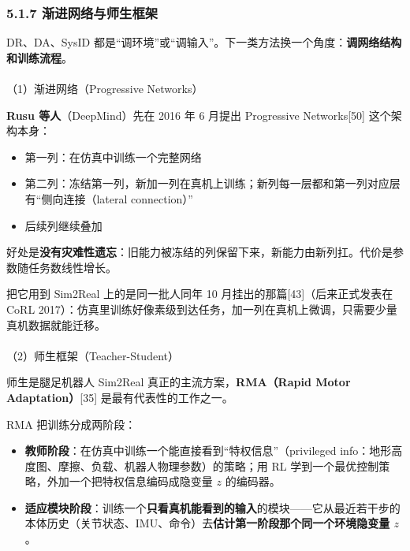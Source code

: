 \documentclass[
  chinese,
]{ctexart}
\makeatletter
\let\oldparagraph\paragraph
\renewcommand{\paragraph}{
    \@ifstar
      \xxxParagraphStar
      \xxxParagraphNoStar
  }
\newcommand{\xxxParagraphStar}[1]{\oldparagraph*{#1}\mbox{}}
\newcommand{\xxxParagraphNoStar}[1]{\oldparagraph{#1}\mbox{}}
\providecommand{\tightlist}{%
  \setlength{\itemsep}{0pt}\setlength{\parskip}{0pt}}
\makeatother
\begin{document}
\subsubsection{5.1.7
渐进网络与师生框架}\label{ux6e10ux8fdbux7f51ux7edcux4e0eux5e08ux751fux6846ux67b6}

DR、DA、SysID
都是``调环境''或``调输入''。下一类方法换一个角度：\textbf{调网络结构和训练流程}。

\paragraph{（1）渐进网络（Progressive
Networks）}\label{ux6e10ux8fdbux7f51ux7edcprogressive-networks}

\textbf{Rusu 等人}（DeepMind）先在 2016 年 6 月提出 Progressive
Networks{[}50{]} 这个架构本身：

\begin{itemize}
\tightlist
\item
  第一列：在仿真中训练一个完整网络
\item
  第二列：冻结第一列，新加一列在真机上训练；新列每一层都和第一列对应层有``侧向连接（lateral
  connection）''
\item
  后续列继续叠加
\end{itemize}

好处是\textbf{没有灾难性遗忘}：旧能力被冻结的列保留下来，新能力由新列扛。代价是参数随任务数线性增长。

把它用到 Sim2Real 上的是同一批人同年 10
月挂出的那篇{[}43{]}（后来正式发表在 CoRL
2017）：仿真里训练好像素级到达任务，加一列在真机上微调，只需要少量真机数据就能迁移。

\paragraph{（2）师生框架（Teacher-Student）}\label{ux5e08ux751fux6846ux67b6teacher-student}

师生是腿足机器人 Sim2Real 真正的主流方案，\textbf{RMA（Rapid Motor
Adaptation）}{[}35{]} 是最有代表性的工作之一。

RMA 把训练分成两阶段：

\begin{itemize}
\tightlist
\item
  \textbf{教师阶段}：在仿真中训练一个能直接看到``特权信息''（privileged
  info：地形高度图、摩擦、负载、机器人物理参数）的策略；用 RL
  学到一个最优控制策略，外加一个把特权信息编码成隐变量 \(z\) 的编码器。
\item
  \textbf{适应模块阶段}：训练一个\textbf{只看真机能看到的输入}的模块------它从最近若干步的本体历史（关节状态、IMU、命令）去\textbf{估计第一阶段那个同一个环境隐变量
  \(z\)}。
\end{itemize}
\end{document}
